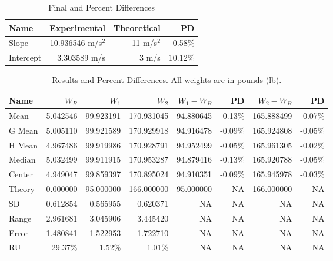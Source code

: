 \begin{table}[ht]
    \centering
    \begin{tabular}{|l|r|r|r|}
        \hline
        \textbf{Name} & \textbf{Experimental} & \textbf{Theoretical} & \textbf{PD} \\
        \hline
        Slope & 10.936546 m/s$^{2}$ & 11 m/s$^{2}$ & -0.58\% \\
        Intercept & 3.303589 m/s & 3 m/s & 10.12\% \\
        \hline
    \end{tabular}
    \caption{Final and Percent Differences}
    \label{table:00.velocity.results}
\end{table}
\newpage
\begin{table}[ht]
    \centering
    \begin{tabular}{|l|r|r|r|r|r|r|r|}
        \hline
        \textbf{Name} & $W_{B}$ & $W_{1}$ & $W_{2}$ & $W_{1} - W_{B}$ & \textbf{PD} & $W_{2} - W_{B}$ & \textbf{PD} \\
        \hline
        Mean & 5.042546 & 99.923191 & 170.931045 & 94.880645 & -0.13\% & 165.888499 & -0.07\% \\
        G Mean & 5.005110 & 99.921589 & 170.929918 & 94.916478 & -0.09\% & 165.924808 & -0.05\% \\
        H Mean & 4.967486 & 99.919986 & 170.928791 & 94.952499 & -0.05\% & 165.961305 & -0.02\% \\
        Median & 5.032499 & 99.911915 & 170.953287 & 94.879416 & -0.13\% & 165.920788 & -0.05\% \\
        Center & 4.949047 & 99.859397 & 170.895024 & 94.910351 & -0.09\% & 165.945978 & -0.03\% \\
        \hline
        Theory & 0.000000 & 95.000000 & 166.000000 & 95.000000 & NA & 166.000000 & NA \\
        \hline
        SD & 0.612854 & 0.565955 & 0.620371 & NA & NA & NA & NA \\
        Range & 2.961681 & 3.045906 & 3.445420 & NA & NA & NA & NA \\
        Error & 1.480841 & 1.522953 & 1.722710 & NA & NA & NA & NA \\
        RU & 29.37\% & 1.52\% & 1.01\% & NA & NA & NA & NA \\
        \hline
    \end{tabular}
    \caption{Results and Percent Differences. All weights are in pounds (lb).}
    \label{table:00.results}
\end{table}
